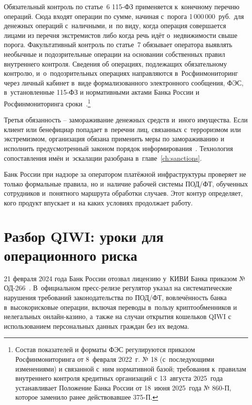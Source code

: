 Обязательный контроль по статье~6 115-ФЗ применяется к~конечному
перечню операций. Сюда входят операции по сумме, начиная с~порога
1\,000\,000~руб.\ для денежных операций с~наличными, и~по виду,
когда операция совершается лицами из перечня экстремистов либо когда
речь идёт о~недвижимости свыше порога. Факультативный контроль
по статье~7 обязывает оператора выявлять необычные и подозрительные
операции на основании собственных правил внутреннего контроля. Сведения об операциях, подлежащих
обязательному контролю, и~о~подозрительных операциях направляются
в~Росфинмониторинг через личный кабинет в~виде формализованного
электронного сообщения, ФЭС, в~установленные 115-ФЗ и нормативными
актами Банка России и Росфинмониторинга
сроки~\cite{fz-115,cbr-860p,rosfinmonitoring-oes}.\footnote{Состав
показателей и форматы ФЭС регулируются приказом Росфинмониторинга
от 8~февраля 2022~г. № 18 (с~последующими изменениями)
и связанной с~ним нормативной базой; требования к~правилам
внутреннего контроля кредитных организаций с 13~августа
2025~года устанавливает Положение Банка России от 18~июня
2025~года № 860-П, которое заменило ранее действовавшее 375-П.}

Третья обязанность -- замораживание денежных средств и~иного
имущества. Если клиент или бенефициар попадает в~перечни лиц,
связанных с~терроризмом или экстремизмом, организация обязана
применить меры по замораживанию и исполнить предусмотренный законом
порядок информирования~\cite{fz-115}. Технология сопоставления имён и~эскалации
разобрана в~главе~\ref{ch:sanctions}.

Банк России при надзоре за оператором платёжной инфраструктуры
проверяет не только формальные правила, но и~наличие рабочей
системы ПОД/ФТ, обученных сотрудников и~понятного маршрута
обработки случаев. Этот контур
определяет, кого продукт впускает
и~на каких условиях продолжает работу.

\section{Разбор QIWI: уроки для операционного риска}\label{sec:aml-qiwi}

21 февраля 2024 года Банк России отозвал лицензию
у~КИВИ Банка приказом № ОД-266~\cite{cbr-qiwi-license-2024}. В~официальном пресс-релизе
регулятор указал на систематические нарушения требований
законодательства по ПОД/ФТ, вовлечённость банка в~высокорисковые
операции, включая переводы в~пользу криптообменников и нелегальных
онлайн-казино, а~также на случаи открытия кошельков QIWI с
использованием персональных данных граждан без их ведома.

